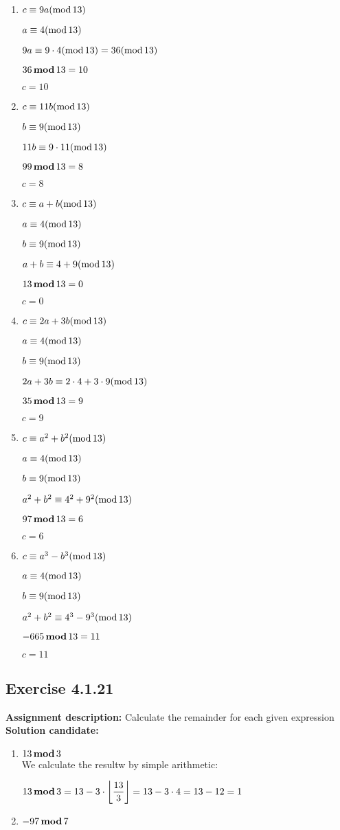 \documentclass{report}
\newcommand{\cent}[1]{\begin{center}#1\end{center}}
\newcommand{\assignmentDescription}{\textbf{Assignment description: }}
\newcommand{\solution}{\textbf{Solution candidate: }}
\newcommand{\Exercise}[1]{\subsection{Exercise #1}}
\newcommand{\defaultEnumerateLabel}{\textbf{\alph*.}}
\newcommand{\modInline}{\text{mod\,}}
\newcommand{\modFunc}{\text{\,\textbf{mod}\,}}
\newcommand{\myItem}[1]{\item #1\\}
\newcommand{\Floor}[1]{\left \lfloor{#1}\right \rfloor }
\begin{document}
\begin{enumerate}[label=\defaultEnumerateLabel]
	\begin{enumerate}[label=\defaultEnumerateLabel]
		\myItem{$c \equiv 9a (\modInline 13)$}
		
		\cent{$a \equiv 4(\modInline 13)$}
		\cent{$9a \equiv 9\cdot 4(\modInline 13) = 36(\modInline 13)$}
		\cent{$36 \modFunc 13 = 10$}
		\cent{$ c = 10$}
		
		\myItem{$c \equiv 11b (\modInline 13)$}
		
		\cent{$b \equiv 9 (\modInline 13)$}
		\cent{$11b\equiv 9 \cdot 11 (\modInline 13)$}
		\cent{$99 \modFunc 13 = 8$}
		\cent{$c = 8$}
		
		\myItem{$c \equiv a+b (\modInline 13)$}
		\cent{$a \equiv 4 (\modInline 13)$}
		\cent{$b \equiv 9 (\modInline 13)$}
		\cent{$a+b\equiv 4+9 (\modInline 13)$}
		\cent{$13 \modFunc 13 = 0$}
		\cent{$c = 0$}
		
		\myItem{$c \equiv 2a+3b (\modInline 13)$}
		
		\cent{$a \equiv 4 (\modInline 13)$}
		\cent{$b \equiv 9 (\modInline 13)$}
		\cent{$2a+3b\equiv 2 \cdot 4+3 \cdot 9 (\modInline 13)$}
		\cent{$35 \modFunc 13 = 9$}
		\cent{$c = 9$}
		
		\myItem{$c \equiv a^2 + b^2 (\modInline 13)$}
		
		\cent{$a \equiv 4 (\modInline 13)$}
		\cent{$b \equiv 9 (\modInline 13)$}
		\cent{$a^2+b^2\equiv 4^2+9^2 (\modInline 13)$}
		\cent{$97 \modFunc 13 = 6$}
		\cent{$c = 6$}
		
		\myItem{$c \equiv a^3 - b^3 (\modInline 13)$}
		
		\cent{$a \equiv 4 (\modInline 13)$}
		\cent{$b \equiv 9 (\modInline 13)$}
		\cent{$a^2+b^2\equiv 4^3-9^3 (\modInline 13)$}
		\cent{$-665 \modFunc 13 = 11$}
		\cent{$c = 11$}
		
	\end{enumerate}
	
	\Exercise{4.1.21}
	
	\assignmentDescription
	Calculate the remainder for each given expression\\
	
	\solution
	\begin{enumerate}[label=\defaultEnumerateLabel]
		
		\myItem{$13 \modFunc 3$}
		
		We calculate the resultw by simple arithmetic:
		
		\cent{$13 \modFunc 3 = 13 -  3 \cdot  \Floor{\dfrac{13}{3}} = 13 - 3 \cdot 4 = 13-12=1$}
		
		\myItem{$-97 \modFunc 7$}
		

\end{enumerate}
\end{enumerate}
\end{document}
